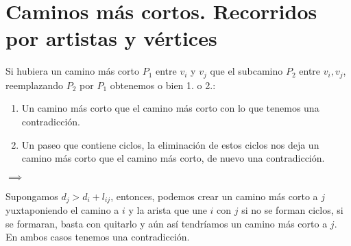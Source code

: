 \documentclass[openany]{book}
\begin{document}
\chapter{Caminos más cortos. Recorridos por artistas y vértices}





\begin{demonstration}
    Si hubiera un camino más corto $ P_1 $ entre $ v_i $ y $ v_j $ que el subcamino $ P_2 $ entre $ v_i,v_j $, reemplazando $ P_2 $ por $ P_1 $ obtenemos o bien 1. o 2.:
    \begin{enumerate}
        \item Un camino más corto que el camino más corto con lo que tenemos una contradicción.
        \item Un paseo que contiene ciclos, la eliminación de estos ciclos nos deja un camino más corto que el camino más corto, de nuevo una contradicción.
    \end{enumerate}
\end{demonstration}


\begin{demonstration}
    $ \implies $

    Supongamos $ d_j > d_i + l_{ij} $, entonces, podemos crear un camino más corto a $ j $ yuxtaponiendo el camino a $ i $ y la arista que une $ i $ con $ j $ si no se forman ciclos, si se formaran, basta con quitarlo y aún así tendríamos un camino más corto a $ j $. En ambos casos tenemos una contradicción.
    
\end{demonstration}
\end{document}
